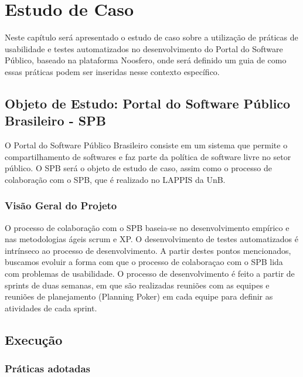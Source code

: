 \chapter{Estudo de Caso}

Neste capítulo será apresentado o estudo de caso sobre a utilização de práticas de usabilidade e testes automatizados no desenvolvimento do Portal do Software Público, baseado na plataforma Noosfero, onde será definido um guia de como essas práticas podem ser inseridas nesse contexto específico.

\section{Objeto de Estudo: Portal do Software Público Brasileiro - SPB}

O Portal do Software Público Brasileiro consiste em um sistema que permite o compartilhamento de softwares e faz parte da política de software livre no setor público.
O SPB será o objeto de estudo de caso, assim como o processo de colaboração com o SPB, que é realizado no LAPPIS da UnB.

\subsection{Visão Geral do Projeto}

O processo de colaboração com o SPB baseia-se no desenvolvimento empírico e nas metodologias ágeis scrum e XP. O desenvolvimento de testes automatizados é intrínseco ao processo de desenvolvimento. A partir destes pontos mencionados, buscamos evoluir a forma com que o processo de colaboraçao com o SPB lida com problemas de usabilidade.
O processo de desenvolvimento é feito a partir de sprints de duas semanas, em que são realizadas reuniões com as equipes e reuniões de planejamento (Planning Poker) em cada equipe para definir as atividades de cada sprint.



 
\section{Execução}

\subsection{Práticas adotadas}


